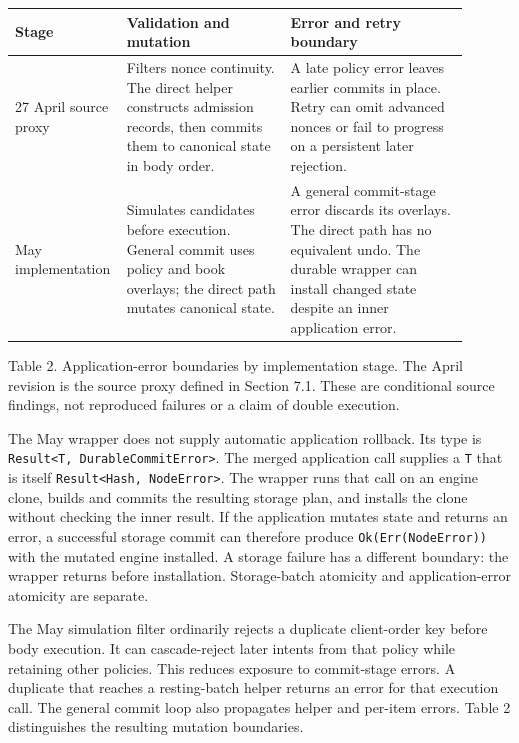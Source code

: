 \documentclass[11pt]{article}
\begin{document}
\begin{center}\begin{minipage}{\linewidth}
{\small\begin{tabular}{@{}p{0.162\linewidth}p{0.351\linewidth}p{0.387\linewidth}@{}}
\toprule
Stage & Validation and mutation & Error and retry boundary \\
\midrule
27 April source proxy & Filters nonce continuity. The direct helper constructs admission records, then commits them to canonical state in body order. & A late policy error leaves earlier commits in place. Retry can omit advanced nonces or fail to progress on a persistent later rejection. \\
May implementation & Simulates candidates before execution. General commit uses policy and book overlays; the direct path mutates canonical state. & A general commit-stage error discards its overlays. The direct path has no equivalent undo. The durable wrapper can install changed state despite an inner application error. \\
\bottomrule
\end{tabular}}
\par\smallskip Table 2. Application-error boundaries by implementation stage. The April revision is the source proxy defined in Section 7.1. These are conditional source findings, not reproduced failures or a claim of double execution. \cite{R29}
\end{minipage}\end{center}
The May wrapper does not supply automatic application rollback. Its type is \texttt{Result<T, DurableCommitError>}. The merged application call supplies a \texttt{T} that is itself \texttt{Result<Hash, NodeError>}. The wrapper runs that call on an engine clone, builds and commits the resulting storage plan, and installs the clone without checking the inner result. If the application mutates state and returns an error, a successful storage commit can therefore produce \texttt{Ok(Err(NodeError))} with the mutated engine installed. A storage failure has a different boundary: the wrapper returns before installation. Storage-batch atomicity and application-error atomicity are separate. \cite{R29}

The May simulation filter ordinarily rejects a duplicate client-order key before body execution. It can cascade-reject later intents from that policy while retaining other policies. This reduces exposure to commit-stage errors. A duplicate that reaches a resting-batch helper returns an error for that execution call. The general commit loop also propagates helper and per-item errors. Table 2 distinguishes the resulting mutation boundaries. \cite{R29}
\end{document}
